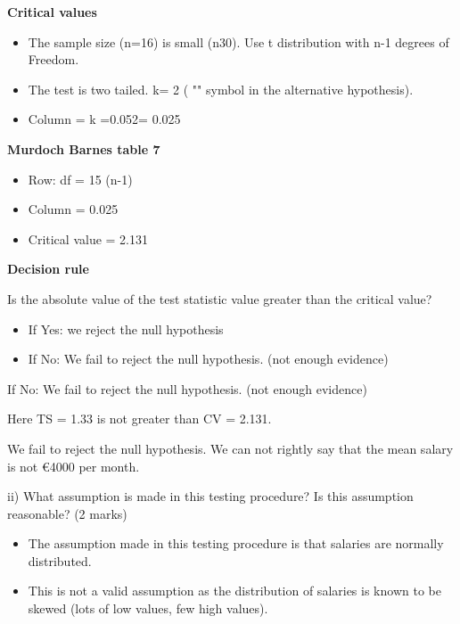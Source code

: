 \documentclass[]{report}
\begin{document}
\noindent \textbf{Critical values}
\begin{itemize}
\item The sample size (n=16) is small (n30). Use t distribution with n-1 degrees of Freedom.
\item The test is two tailed.  k= 2  ( "" symbol in the alternative hypothesis).
\item Column = k =0.052= 0.025
\end{itemize}

\textbf{Murdoch Barnes table 7}

\begin{itemize}
\item Row: df = 15         (n-1)
\item Column = 0.025
\item Critical value =  2.131 
\end{itemize}


\noindent \textbf{Decision rule}

\begin{framed}
\noindent Is the absolute value of the test statistic value greater than the critical value?
\begin{itemize}
\item If Yes: we reject the null hypothesis

\item If No: We fail to reject the null hypothesis. (not enough evidence)
\end{itemize}
\end{framed}

If No: We fail to reject the null hypothesis. (not enough evidence)


Here TS = 1.33  is not greater than CV = 2.131.


We fail to reject the null hypothesis. We can not rightly say that the mean salary is not €4000 per month.


ii)      What assumption is made in this testing procedure? Is this assumption reasonable?  (2 marks)

\begin{framed}
\begin{itemize}
\item The assumption made in this testing procedure is that salaries are normally distributed.
\item This is not a valid assumption as the distribution of salaries is known to be skewed (lots of low values, few high values).
\end{itemize}
\end{framed}
\end{document}
